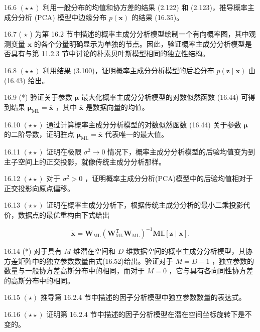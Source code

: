 \documentclass[10pt]{report}
\begin{document}
16.6 \(\left( {\star  \star  }\right)\) 利用一般分布的均值和协方差的结果 (2.122) 和 (2.123)，推导概率主成分分析 (PCA) 模型中边缘分布 \(p\left( \mathbf{x}\right)\) 的结果 (16.35)。

16.7 ( \(\star\) ) 为第 16.2 节中描述的概率主成分分析模型绘制一个有向概率图，其中观测变量 \(\mathbf{x}\) 的各个分量明确显示为单独的节点。因此，验证概率主成分分析模型是否具有与第 11.2.3 节中讨论的朴素贝叶斯模型相同的独立性结构。

16.8 \(\left( {\star  \star  }\right)\) 利用结果 (3.100)，证明概率主成分分析模型的后验分布 \(p\left( {\mathbf{z} \mid  \mathbf{x}}\right)\) 由 (16.43) 给出。

16.9 (*) 验证关于参数 \(\mathbf{\mu }\) 最大化概率主成分分析模型的对数似然函数 (16.44) 可得到结果 \({\mathbf{\mu }}_{\mathrm{{ML}}} = \overline{\mathbf{x}}\) ，其中 \(\overline{\mathbf{x}}\) 是数据向量的均值。

16.10 \(\left( {\star  \star  }\right)\) 通过计算概率主成分分析模型的对数似然函数 (16.44) 关于参数 \(\mathbf{\mu }\) 的二阶导数，证明驻点 \({\mathbf{\mu }}_{\mathrm{{ML}}} = \overline{\mathbf{x}}\) 代表唯一的最大值。

16.11 \(\left( {\star  \star  }\right)\) 证明在极限 \({\sigma }^{2} \rightarrow  0\) 情况下，概率主成分分析模型的后验均值变为到主子空间上的正交投影，就像传统主成分分析那样。

16.12 \(\left( {\star  \star  }\right)\) 对于 \({\sigma }^{2} > 0\) ，证明概率主成分分析(PCA)模型中的后验均值相对于正交投影向原点偏移。

16.13 \(\left( {\star  \star  }\right)\) 证明在概率主成分分析下，根据传统主成分分析的最小二乘投影代价，数据点的最优重构由下式给出

\[
\widetilde{\mathbf{x}} = {\mathbf{W}}_{\mathrm{{ML}}}{\left( {\mathbf{W}}_{\mathrm{{ML}}}^{\mathrm{T}}{\mathbf{W}}_{\mathrm{{ML}}}\right) }^{-1}\mathbf{M}\mathbb{E}\left\lbrack  {\mathbf{z} \mid  \mathbf{x}}\right\rbrack  . \tag{16.88}
\]

16.14 (*) 对于具有 \(M\) 维潜在空间和 \(D\) 维数据空间的概率主成分分析模型，其协方差矩阵中的独立参数数量由式(16.52)给出。验证对于 \(M = D - 1\) ，独立参数的数量与一般协方差高斯分布中的相同，而对于 \(M = 0\) ，它与具有各向同性协方差的高斯分布中的相同。

16.15 \(\left( \star \right)\) 推导第 16.2.4 节中描述的因子分析模型中独立参数数量的表达式。

16.16 \(\left( {\star  \star  }\right)\) 证明第 16.2.4 节中描述的因子分析模型在潜在空间坐标旋转下是不变的。
\end{document}
